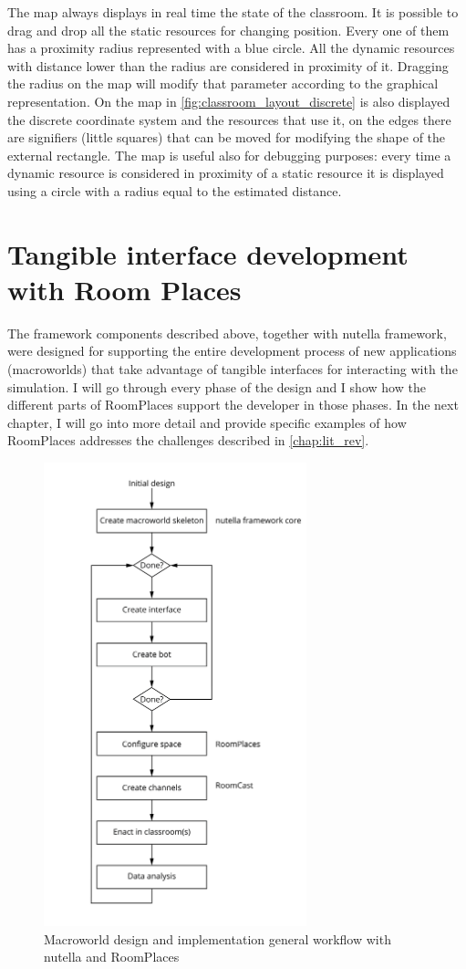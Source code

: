 The map always displays in real time the state of the classroom. It is possible to drag and drop all the static resources for changing position. Every one of them has a proximity radius represented with a blue circle. All the dynamic resources with distance lower than the radius are considered in proximity of it. Dragging the radius on the map will modify that parameter according to the graphical representation. On the map in \ref{fig:classroom_layout_discrete} is also displayed the discrete coordinate system and the resources that use it, on the edges there are signifiers (little squares) that can be moved for modifying the shape of the external rectangle. The map is useful also for debugging purposes: every time a dynamic resource is considered in proximity of a static resource it is displayed using a circle with a radius equal to the estimated distance. 

\section{Tangible interface development with Room Places}
The framework components described above, together with nutella framework, were designed for supporting the entire development process of new applications (macroworlds) that take advantage of tangible interfaces for interacting with the simulation. I will go through every phase of the design and I show how the different parts of RoomPlaces support the developer in those phases. In the next chapter, I will go into more detail and provide specific examples of how RoomPlaces addresses the challenges described in \autoref{chap:lit_rev}.

\begin{figure}
\centering
\includegraphics[width=3in]{images/nutella_workflow.png}
\caption{Macroworld design and implementation general workflow with nutella and RoomPlaces}
\label{fig:nutella_workflow}
\end{figure}


